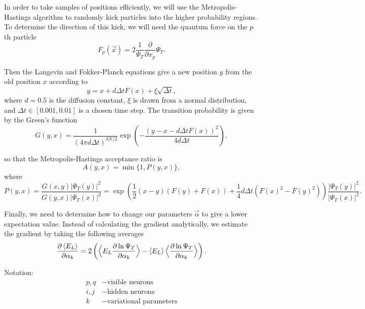 \documentclass[12pt]{article}
\begin{document}
\noindent In order to take samples of positions efficiently, we will use the Metropolis-Hastings algorithm to randomly kick particles into the higher probability regions. To determine the direction of this kick, we will need the quantum force on the $p$th particle
\begin{equation}
F_p(\vec{x}) = 2 \frac{1}{\Psi_T} \frac{\partial}{\partial x_p} \Psi_T.
\end{equation}

\noindent Then the Langevin and Fokker-Planck equations give a new position $y$ from the old position $x$ according to
\begin{equation}
y = x + d \Delta t F(x) + \xi \sqrt{\Delta t},
\end{equation}
\noindent where $d = 0.5$ is the diffusion constant, $\xi$ is drawn from a normal distribution, and $\Delta t \in [0.001,0.01]$ is a chosen time step. The transition probability is given by the Green's function 
\begin{equation}
G(y,x) = \frac{1}{(4\pi d \Delta t)^{3N/2}} \exp \left( - \frac{(y-x-d \Delta t F(x))^2}{4 d \Delta t} \right), 
\end{equation}

\noindent so that the Metropolis-Hastings acceptance ratio is
\begin{equation}
A(y,x) = \min \{ 1,P(y,x) \}, 
\end{equation} 
\noindent where
\begin{equation}
P(y,x) = \frac{G(x,y)|\Psi_T(y)|^2}{G(y,x)|\Psi_T(x)|^2} = \exp \left( \frac{1}{2} (x-y)(F(y)+F(x)) + \frac{1}{4} d \Delta t (F(x)^2-F(y)^2) \right) \frac{|\Psi_T(y)|^2}{|\Psi_T(x)|^2}.
\end{equation}

\noindent Finally, we need to determine how to change our parameters $\vec{\alpha}$ to give a lower expectation value. Instead of calculating the gradient analytically, we estimate the gradient by taking the following averages
\begin{equation}
\frac{\partial \braket{E_L}}{\partial \alpha_k} = 2 \left( \Big\langle E_L \frac{\partial \ln \Psi_T}{\partial \alpha_k} \Big\rangle - \braket{E_L} \Big\langle \frac{\partial \ln \Psi_T}{\partial \alpha_k} \Big\rangle \right).
\end{equation}

\noindent Notation:
\begin{align*}
p,q &- \text{visible neurons}\\
i,j &- \text{hidden neurons}\\
k &- \text{variational parameters}
\end{align*}
\end{document}
